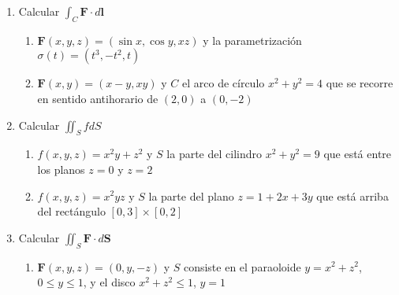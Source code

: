 \documentclass{article}
\begin{document}
\begin{enumerate}
        \item {
           Calcular $\int_{C} \mathbf{F} \cdot d \mathbf{l}$

            \begin{enumerate}
            \item{
				$\mathbf{F} (x,y,z) = (\sin x,\cos y,xz)$ y la parametrización $\sigma (t) = (t^3,-t^2,t)$

			\color{azul}


            }

            \item{
            	$\mathbf{F} (x,y) = (x-y,xy)$ y $C$ el arco de círculo $x^2 + y^2 = 4$ que se recorre en sentido antihorario de $(2,0)$ a $(0,-2)$

           \color{azul}

            }
            \end{enumerate}
        }

        \item {
            Calcular $\iint_{S} f dS$

            \begin{enumerate}
            \item{
				$f(x,y,z) = x^2y + z^2$ y $S$ la parte del cilindro $x^2 + y^2 = 9$ que está entre los planos $z=0$ y $z=2$

			\color{azul}


            }

            \item{
            	$f(x,y,z) = x^2yz$ y $S$ la parte del plano $z = 1 + 2x + 3y$ que está arriba del rectángulo $[0,3] \times [0,2]$

           \color{azul}

            }
            \end{enumerate}


	    }

        \item {
           Calcular $\iint_{S} \mathbf{F} \cdot d \mathbf{S}$

            \begin{enumerate}
            \item{
				$\mathbf{F} (x,y,z) = (0,y,-z)$ y $S$ consiste en el paraoloide $y = x^2 + z^2$, $0 \leq y \leq 1$, y el disco $x^2 + z^2 \leq 1$, $y = 1$

}
\end{enumerate}}
\end{enumerate}
\end{document}
